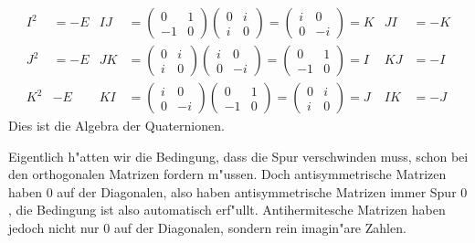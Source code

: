 \begin{beispiel}
\begin{align*}
I^2
&=
-E
&
IJ
&=
\begin{pmatrix} 0&1 \\ -1& 0 \end{pmatrix}
\begin{pmatrix} 0&i \\  i& 0 \end{pmatrix}
=
\begin{pmatrix} i&0 \\  0&-i \end{pmatrix}
=
K
&
JI
&=
-K
\\
J^2
&=
-E
&
JK
&=
\begin{pmatrix} 0&i \\  i& 0 \end{pmatrix}
\begin{pmatrix} i&0 \\  0&-i \end{pmatrix}
=
\begin{pmatrix} 0&1 \\ -1& 0 \end{pmatrix}
=
I
&
KJ
&=
-I
\\
K^2
&
-E
&
KI
&=
\begin{pmatrix} i&0 \\  0&-i \end{pmatrix}
\begin{pmatrix} 0&1 \\ -1& 0 \end{pmatrix}
=
\begin{pmatrix} 0&i \\  i& 0 \end{pmatrix}
=
J
&
IK
&=
-J
\end{align*}
Dies ist die Algebra der Quaternionen.
\end{beispiel}

Eigentlich h"atten wir die Bedingung, dass die Spur verschwinden muss,
schon bei den orthogonalen Matrizen fordern m"ussen.
Doch antisymmetrische Matrizen haben $0$ auf der Diagonalen, also haben
antisymmetrische Matrizen immer Spur $0$, die Bedingung ist also
automatisch erf"ullt.
Antihermitesche Matrizen haben jedoch nicht nur $0$ auf der Diagonalen,
sondern rein imagin"are Zahlen.



